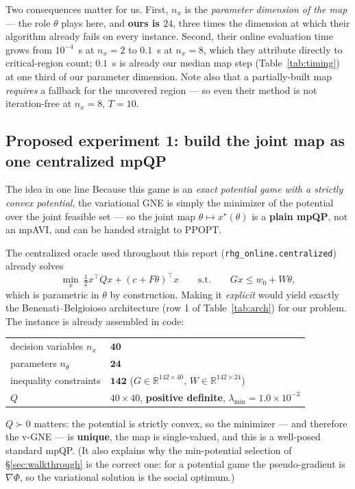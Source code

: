 \documentclass[11pt, letterpaper]{article}
\begin{document}
Two consequences matter for us. First, $n_x$ is the \emph{parameter dimension of the map} --- the role
$\theta$ plays here, and \textbf{ours is $24$}, three times the dimension at which their algorithm
already fails on every instance. Second, their online evaluation time grows from $10^{-4}$~s at
$n_x{=}2$ to $0.1$~s at $n_x{=}8$, which they attribute directly to critical-region count; $0.1$~s is
already our median map step (Table~\ref{tab:timing}) at one third of our parameter dimension. Note
also that a partially-built map \emph{requires} a fallback for the uncovered region --- so even their
method is not iteration-free at $n_x{=}8$, $T{=}10$.

\subsection{Proposed experiment 1: build the joint map as one centralized mpQP}\label{sec:exp1}
\begin{keybox}{The idea in one line}
Because this game is an \emph{exact potential game with a strictly convex potential}, the variational
GNE is simply the minimizer of the potential over the joint feasible set --- so the joint map
$\theta\mapsto x^\star(\theta)$ is a \textbf{plain mpQP}, not an mpAVI, and can be handed straight to
PPOPT.
\end{keybox}
The centralized oracle used throughout this report (\texttt{rhg\_online.centralized}) already solves
\[
  \min_x\ \tfrac12x^\top Qx+(c+F\theta)^\top x
  \qquad\text{s.t.}\qquad Gx\le w_0+W\theta ,
\]
which is parametric in $\theta$ by construction. Making it \emph{explicit} would yield exactly the
Benenati--Belgioioso architecture (row 1 of Table~\ref{tab:arch}) for our problem. The instance is
already assembled in code:
\begin{center}\small
\begin{tabular}{ll}
\toprule
decision variables $n_x$ & $\mathbf{40}$\\
parameters $n_\theta$ & $\mathbf{24}$\\
inequality constraints & $\mathbf{142}$ \quad ($G\in\mathbb R^{142\times40}$, $W\in\mathbb R^{142\times24}$)\\
$Q$ & $40\times40$, \textbf{positive definite}, $\lambda_{\min}=1.0\times10^{-3}$\\
\bottomrule
\end{tabular}
\end{center}
$Q\succ0$ matters: the potential is strictly convex, so the minimizer --- and therefore the v-GNE ---
is \textbf{unique}, the map is single-valued, and this is a well-posed standard mpQP. (It also
explains why the min-potential selection of \S\ref{sec:walkthrough} is the correct one: for a
potential game the pseudo-gradient is $\nabla\Phi$, so the variational solution is the social
optimum.)
\end{document}
